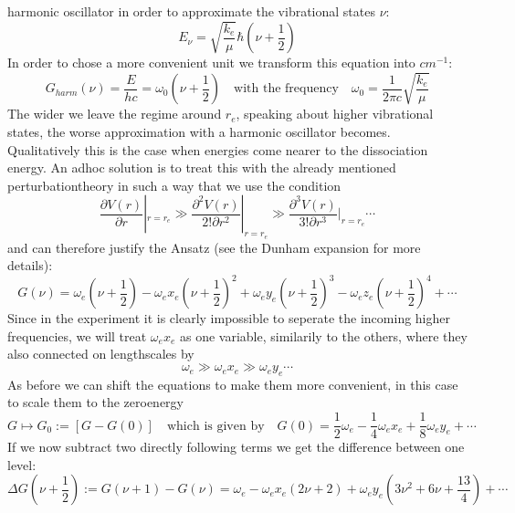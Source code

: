 harmonic oscillator in order to approximate
the vibrational states $\nu$:
\begin{equation}
    E_\nu =\sqrt{\frac{k_e}{\mu}}\hbar \left (\nu
        + \frac{1}{2}\right )
\end{equation}
In order to chose a more convenient unit we transform this
equation into $cm^{-1}$:
\begin{equation}
    G_{harm}(\nu) = \frac{E}{hc} = \omega_0 (\nu + \frac{1}{2})
    \quad \text{with the frequency} \quad
    \omega_0 = \frac{1}{2\pi c} \sqrt{\frac{k_e}{\mu}}
\end{equation}
The wider we leave the regime around $r_e$, speaking about 
higher vibrational states, the worse approximation with a harmonic
oscillator becomes. Qualitatively this is the case when energies
come nearer to the dissociation energy. An adhoc solution is 
to treat this with the already mentioned perturbationtheory in such
a way that we use the condition
\begin{equation}
    \frac{\partial V(r)}{\partial r}|_{r=r_e}        \gg
    \frac{\partial^2 V(r)}{2!\partial r^2}|_{r=r_e}  \gg
    \frac{\partial^3 V(r)}{3!\partial r^3}|_{r=r_e}  
    \cdots
\end{equation}
and can therefore justify the Ansatz (see the Dunham expansion
    for more details):
\begin{equation}
    G(\nu) = \omega_e (\nu + \frac{1}{2} ) 
    - \omega_e x_e (\nu + \frac{1}{2} ) ^2 
    + \omega_e y_e (\nu + \frac{1}{2} ) ^3 
    - \omega_e z_e (\nu + \frac{1}{2} ) ^4 
    + \cdots 
\end{equation}
Since in the experiment it is clearly impossible to seperate
the incoming higher frequencies, we will treat $\omega_e x_e$ as 
one variable, similarily to the others, where they also connected
on lengthscales by
\begin{equation}
    \omega_e \gg \omega_ex_e \gg \omega_e y_e \cdots 
\end{equation}
As before we can shift the equations to make them more convenient,
in this case to scale them to the zeroenergy
\begin{equation}
    G \mapsto G_0 := \left [G-G(0) \right ] 
        \quad \text{which is given by}
    \quad G(0)=\frac{1}{2}\omega_e - \frac{1}{4}\omega_e x_e 
    + \frac{1}{8} \omega_e y_e + \cdots 
\end{equation}
If we now subtract two directly following terms we get the 
difference between one level:
\begin{equation}
    \Delta G(\nu +\frac{1}{2}) := G(\nu +1 ) - G(\nu) 
    = \omega_e - \omega_e x_e \left (2\nu +2\right ) + \omega_e y_e 
    \left (3\nu^2+ 6\nu + \frac{13}{4} 
        \right) + \cdots 
\end{equation} 

